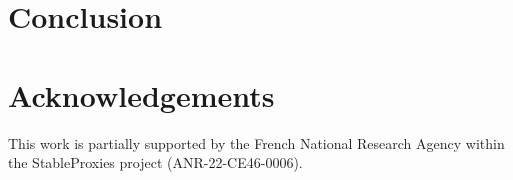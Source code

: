 \documentclass[iicol,pdflatex,sn-mathphys-num]{sn-jnl}
\theoremstyle{definition}
\begin{document}


    \section{Conclusion}
    

    \section*{Acknowledgements}
    This work is partially supported by the French National Research Agency
    within the StableProxies project (ANR-22-CE46-0006).

%
%
%
    

    \appendix
    
\end{document}
